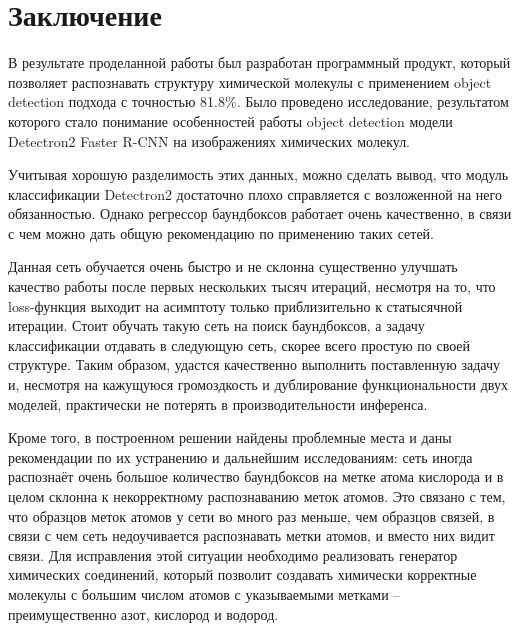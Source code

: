 \chapter*{Заключение} \label{ch-conclusion}

В результате проделанной работы был разработан программный продукт, который позволяет распознавать структуру химической молекулы с применением object detection подхода с точностью 81.8\%. Было проведено исследование, результатом которого стало понимание особенностей работы object detection модели Detectron2 Faster R-CNN на изображениях химических молекул.

Учитывая хорошую разделимость этих данных, можно сделать вывод, что модуль классификации Detectron2 достаточно плохо справляется с возложенной на него обязанностью. Однако регрессор баундбоксов работает очень качественно, в связи с чем можно дать общую рекомендацию по применению таких сетей.

Данная сеть обучается очень быстро и не склонна существенно улучшать качество работы после первых нескольких тысяч итераций, несмотря на то, что loss-функция выходит на асимптоту только приблизительно к статысячной итерации. Стоит обучать такую сеть на поиск баундбоксов, а задачу классификации отдавать в следующую сеть, скорее всего простую по своей структуре. Таким образом, удастся качественно выполнить поставленную задачу и, несмотря на кажущуюся громоздкость и дублирование функциональности двух моделей, практически не потерять в производительности инференса.

Кроме того, в построенном решении найдены проблемные места и даны рекомендации по их устранению и дальнейшим исследованиям: сеть иногда распознаёт очень большое количество баундбоксов на метке атома кислорода и в целом склонна к некорректному распознаванию меток атомов. Это связано с тем, что образцов меток атомов у сети во много раз меньше, чем образцов связей, в связи с чем сеть недоучивается распознавать метки атомов, и вместо них видит связи. Для исправления этой ситуации необходимо реализовать генератор химических соединений, который позволит создавать химически корректные молекулы с большим числом атомов с указываемыми метками -- преимущественно азот, кислород и водород.

